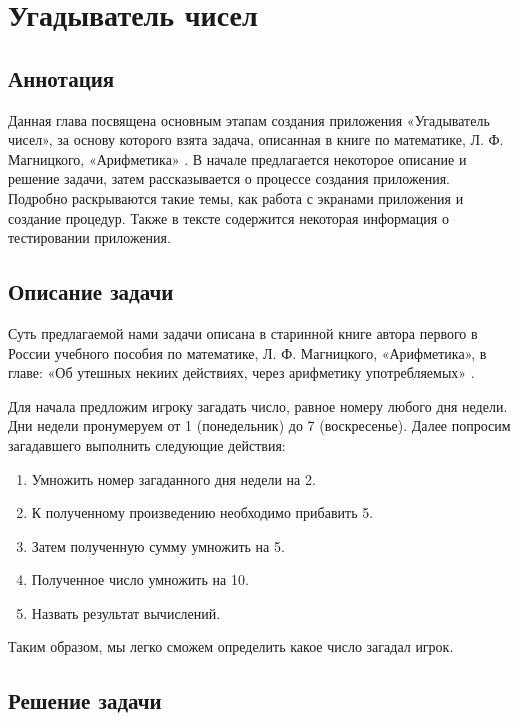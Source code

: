 \chapter{Угадыватель чисел}
\label{ch:guessnumbers}

\section{Аннотация} 

Данная глава посвящена основным этапам создания приложения «Угадыватель чисел», за основу которого взята задача, описанная в книге по математике, Л. Ф. Магницкого, «Арифметика» \cite{Galanin}.
В начале предлагается некоторое описание и решение задачи, затем рассказывается о процессе создания приложения. Подробно раскрываются такие темы, как работа с экранами приложения и создание процедур.
Также в тексте содержится некоторая информация о тестировании приложения.

\section{Описание задачи}

Суть предлагаемой нами задачи описана в старинной книге автора первого в России учебного пособия по математике, Л. Ф. Магницкого, «Арифметика», в главе: «Об утешных некиих действиях, через арифметику употребляемых» \cite{Galanin}.

Для начала предложим игроку загадать число, равное номеру любого дня недели. Дни недели пронумеруем от 1 (понедельник) до 7 (воскресенье). Далее попросим загадавшего выполнить следующие действия:

\begin{enumerate}
\item Умножить номер загаданного дня недели на 2.
\item К полученному произведению необходимо прибавить 5.
\item Затем полученную сумму умножить на 5.
\item Полученное число умножить на 10.
\item Назвать результат вычислений.
\end{enumerate}

Таким образом, мы легко сможем определить какое число загадал игрок.

\section{Решение задачи}

